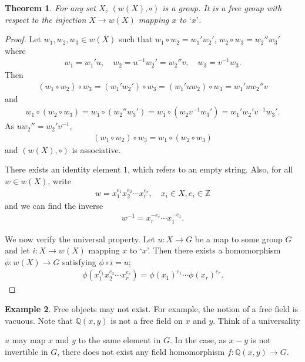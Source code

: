 \documentclass[12pt]{report}
\theoremstyle{plain}
\newtheorem{theorem}{Theorem}[section]
\theoremstyle{remark}
\theoremstyle{definition}
\newtheorem{example}[theorem]{Example}
\newcommand{\Z}{\mathbb{Z}}
\newcommand{\Q}{\mathbb{Q}}
\begin{document}
\begin{theorem}
    For any set $X$, $(w(X),\circ)$ is a group. It is a free group with respect to the injection $X\rightarrow w(X)$ mapping $x$ to $\text{`}x\text{'}$.
\end{theorem}
\begin{proof}
    Let $w_1,w_2,w_3\in w(X)$ such that $w_1\circ w_2=w_1'w_2'$, $w_2\circ w_3 = w_2''w_3'$ where
    \begin{align*}
        w_1 = w_1'u,\quad w_2 = u^{-1}w_2' = w_2''v,\quad w_3=v^{-1}w_3.
    \end{align*}
    Then 
    \begin{align*}
        (w_1\circ w_2)\circ w_3 = (w_1'w_2')\circ w_3 = (w_1'uw_2)\circ w_3 = w_1'uw_2''v
    \end{align*}
    and
    \begin{align*}
        w_1\circ (w_2\circ w_3) = w_1\circ(w_2''w_3') = w_1\circ (w_2v^{-1}w_3') = w_1'w_2'v^{-1}w_3'.
    \end{align*}
    As $uw_2''=w_2'v^{-1}$,
    \begin{align*}
        (w_1\circ w_2)\circ w_3 = w_1\circ (w_2\circ w_3)
    \end{align*}
    and $(w(X),\circ)$ is associative.

    There exists an identity element $1$, which refers to an empty string. Also, for all $w\in w(X)$, write
    \begin{align*}
        w=x_1^{e_1}x_2^{e_2}\cdots x_r^{e_r},\quad x_i\in X,e_i\in \Z
    \end{align*}
    and we can find the inverse
    \begin{align*}
        w^{-1} = x_r^{-e_r}\cdots x_1^{-e_1}.
    \end{align*}

    We now verify the universal property. Let $u:X\rightarrow G$ be a map to some group $G$ and let $i:X\rightarrow w(X)$ mapping $x$ to `$x$'. Then there exists a homomorphism $\phi:w(X)\rightarrow G$ satisfying $\phi\circ i = u$;
    \begin{align*}
        \phi(x_1^{e_1}x_2^{e_2}\cdots x_r^{e_r}) = \phi(x_1)^{e_1}\cdots \phi(x_r)^{e_r}.
    \end{align*}
\end{proof}

\begin{example}
    Free objects may not exist. For example, the notion of a free field is vacuous. Note that $\Q(x,y)$ is not a free field on $x$ and $y$. Think of a universality
    \begin{figure}[H]
    \centering
    \end{figure}
    \noindent
    $u$ may map $x$ and $y$ to the same element in $G$. In the case, as $x-y$ is not invertible in $G$, there does not exist any field homomorphism $f:\Q(x,y)\rightarrow G$.
\end{example}
\end{document}
